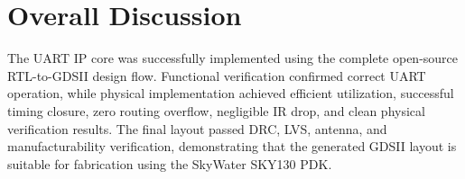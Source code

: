\section{Overall Discussion}

The UART IP core was successfully implemented using the complete open-source RTL-to-GDSII design flow. Functional verification confirmed correct UART operation, while physical implementation achieved efficient utilization, successful timing closure, zero routing overflow, negligible IR drop, and clean physical verification results. The final layout passed DRC, LVS, antenna, and manufacturability verification, demonstrating that the generated GDSII layout is suitable for fabrication using the SkyWater SKY130 PDK.